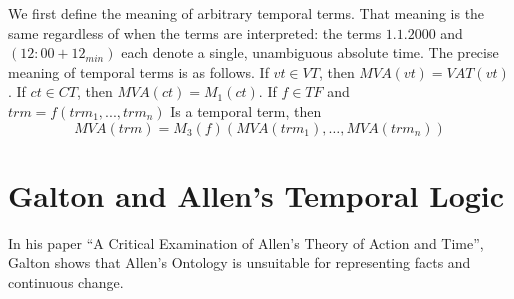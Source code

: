 We first define the meaning of arbitrary temporal terms. That meaning is the same regardless of when the terms are interpreted: the terms $1.1.2000$ and
$(12:00 + 12_{min})$ each denote a single, unambiguous absolute time. The precise
meaning of temporal terms is as follows. If $vt \in VT $, then $MVA (vt) = VAT (vt)$.
If $ct \in CT$, then $MVA (ct) = M_1(ct)$. If $f \in T F$ and $trm = f(trm_1, . . . , trm_n)$ Is a
temporal term, then
\[
  MVA(trm) = M_3(f)(MVA(trm_1), \dots, MVA(trm_n))
\]

\pagebreak

\section{Galton and Allen's Temporal Logic}
In his paper ``A Critical Examination of Allen's
Theory of Action and Time''\cite{galton2004}, Galton shows that Allen's Ontology is unsuitable for representing facts and continuous change.
